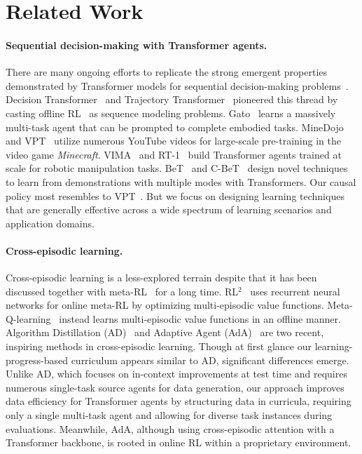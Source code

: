 \documentclass{article}
\newcommand{\para}[1]{\paragraph{#1}\looseness=-1}
\begin{document}
\section{Related Work}
\label{sec:related_work}
\para{Sequential decision-making with Transformer agents.}
There are many ongoing efforts to replicate the strong emergent properties demonstrated by Transformer models for sequential decision-making problems~\citep{yang2023foundation}.
Decision Transformer~\citep{chen2021decisiontransformer} and Trajectory Transformer~\citep{janner2021onebigsequence} pioneered this thread by casting offline RL~\citep{levine2020offline} as sequence modeling problems.
Gato~\citep{reed2022gato} learns a massively multi-task agent that can be prompted to complete embodied tasks.
MineDojo~\citep{fan2022minedojo} and VPT~\citep{openai2022vpt} utilize numerous YouTube videos for large-scale pre-training in the video game \textit{Minecraft}.
VIMA~\citep{jiang2022vima} and RT-1~\citep{brohan2022rt1} build Transformer agents trained at scale for robotic manipulation tasks.
BeT~\citep{shafiullah2022behavior} and C-BeT~\citep{cui2022play} design novel techniques to learn from demonstrations with multiple modes with Transformers.
Our causal policy most resembles to VPT~\citep{openai2022vpt}. But we focus on designing learning techniques that are generally effective across a wide spectrum of learning scenarios and application domains.
\vspace{-0.5em}
\para{Cross-episodic learning.}
Cross-episodic learning is a less-explored terrain despite that it has been discussed together with meta-RL~\citep{wang2016learning} for a long time.
RL$^2$~\citep{duan2016rl2} uses recurrent neural networks for online meta-RL by optimizing multi-episodic value functions.
Meta-Q-learning~\citep{fakoor2019metaqlearning} instead learns multi-episodic value functions in an offline manner.
Algorithm Distillation (AD)~\citep{laskin2023incontext} and Adaptive Agent (AdA)~\citep{team2023humantimescale} are two recent, inspiring methods in cross-episodic learning.
Though at first glance our learning-progress-based curriculum appears similar to AD, significant differences emerge. Unlike AD, which focuses on in-context improvements at test time and requires numerous single-task source agents for data generation, our approach improves data efficiency for Transformer agents by structuring data in curricula, requiring only a single multi-task agent and allowing for diverse task instances during evaluations.
Meanwhile, AdA, although using cross-episodic attention with a Transformer backbone, is rooted in online RL within a proprietary environment.
\end{document}
